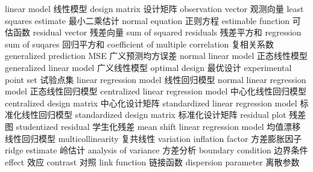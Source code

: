 {linear model} 
{线性模型}
{design matrix} 
{设计矩阵}
{observation vector} 
{观测向量}
{least squares estimate} 
{最小二乘估计}
{normal equation} 
{正则方程}
{estimable function} 
{可估函数}
{residual vector} 
{残差向量}
{sum of squared residuals} 
{残差平方和}
{regression sum of suqares} 
{回归平方和}
{coefficient of multiple correlation} 
{复相关系数}
{generalized prediction MSE} 
{广义预测均方误差}
{normal linear model} 
{正态线性模型}
{generalized linear model} 
{广义线性模型}
{optimal design} 
{最优设计}
{experimental point set} 
{试验点集}
{linear regression model} 
{线性回归模型}
{normal linear regression model} 
{正态线性回归模型}
{centralized linear regression model} 
{中心化线性回归模型}
{centralized design matrix} 
{中心化设计矩阵}
{standardized linear regression model} 
{标准化线性回归模型}
{standardized design matrix} 
{标准化设计矩阵}
{residual plot} 
{残差图}
{studentized residual} 
{学生化残差}
{mean shift linear regression model} 
{均值漂移线性回归模型}
{multicollinearity} 
{复共线性}
{variation inflation factor} 
{方差膨胀因子}
{ridge estimate} 
{岭估计}
{analysis of variance} 
{方差分析}
{boundary condition} 
{边界条件}
{effect} 
{效应}
{contrast} 
{对照}
{link function} 
{链接函数}
{dispersion parameter} 
{离散参数}